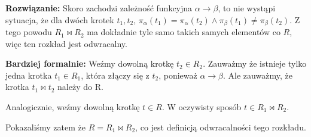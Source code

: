 \documentclass{article}
\begin{document}
\textbf{Rozwiązanie:} Skoro zachodzi zależność funkcyjna $\alpha \rightarrow \beta$, to nie wystąpi sytuacja, że dla dwóch krotek $t_1, t_2$, $\pi_\alpha(t_1)=\pi_\alpha(t_2) \wedge \pi_\beta(t_1) \neq \pi_\beta(t_2)$. Z tego powodu $R_1 \Join R_2$ ma dokładnie tyle samo takich samych elementów co $R$, więc ten rozkład jest odwracalny.

\textbf{Bardziej formalnie:} Weźmy dowolną krotkę $t_2 \in R_2$. Zauważmy że istnieje tylko jedna krotka $t_1 \in R_1$, która złączy się z $t_2$, ponieważ $\alpha \rightarrow \beta$. Ale zauważmy, że krotka $t_1 \Join t_2$ należy do R.

Analogicznie, weźmy dowolną krotkę $t \in R$. W oczywisty sposób $t \in R_1 \Join R_2$.

Pokazaliśmy zatem że $R = R_1 \Join R_2$, co jest definicją odwracalności tego rozkładu.
\end{document}
